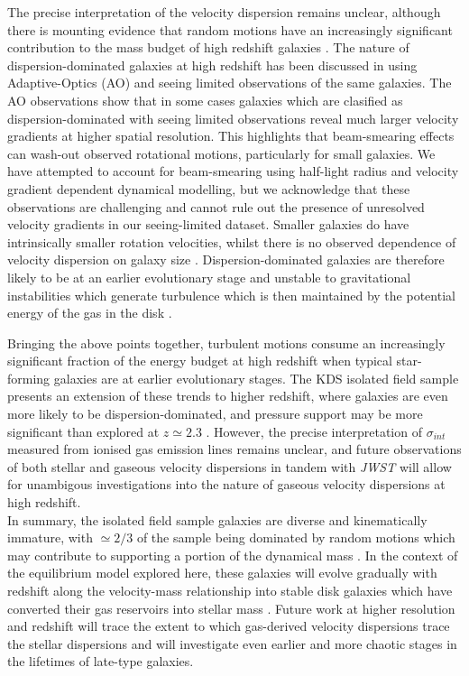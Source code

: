 \documentclass[fleqn,usenatbib]{mnras}
\begin{document}
The precise interpretation of the velocity dispersion remains unclear, although there is mounting evidence that random motions have an increasingly significant contribution to the mass budget of high redshift galaxies \citep[e.g.][]{Kassin2007,Law2009,Burkert2010,Kassin2012,Wuyts2016b,Lang2017,Ubler2017,Genzel2017}.
The nature of dispersion-dominated galaxies at high redshift has been discussed in \cite{Newman2013} using Adaptive-Optics (AO) and seeing limited observations of the same galaxies.
The AO observations show that in some cases galaxies which are clasified as dispersion-dominated with seeing limited observations reveal much larger velocity gradients at higher spatial resolution.
This highlights that beam-smearing effects can wash-out observed rotational motions, particularly for small galaxies.
We have attempted to account for beam-smearing using half-light radius and velocity gradient dependent dynamical modelling, but we acknowledge that these observations are challenging and cannot rule out the presence of unresolved velocity gradients in our seeing-limited dataset.
Smaller galaxies do have intrinsically smaller rotation velocities, whilst there is no observed dependence of velocity dispersion on galaxy size \citep[e.g.][]{Newman2013}.
Dispersion-dominated galaxies are therefore likely to be at an earlier evolutionary stage and unstable to gravitational instabilities which generate turbulence which is then maintained by the potential energy of the gas in the disk \citep{Burkert2010,Newman2013}.

Bringing the above points together, turbulent motions consume an increasingly significant fraction of the energy budget at high redshift when typical star-forming galaxies are at earlier evolutionary stages.
The KDS isolated field sample presents an extension of these trends to higher redshift, where galaxies are even more likely to be dispersion-dominated, and pressure support may be more significant than explored at $z\simeq2.3$ \citep{Wuyts2016b,Ubler2017,Genzel2017,Lang2017}.    
However, the precise interpretation of $\sigma_{int}$ measured from ionised gas emission lines remains unclear, and future observations of both stellar and gaseous velocity dispersions in tandem with {\it JWST} will allow for unambigous investigations into the nature of gaseous velocity dispersions at high redshift. \\

\noindent
In summary, the isolated field sample galaxies are diverse and kinematically immature, with $\simeq2/3$ of the sample being dominated by random motions which may contribute to supporting a portion of the dynamical mass \citep[e.g.][]{Kassin2007,Burkert2010,Kassin2012,Newman2013,Straatman2017,Ubler2017,Lang2017}.
In the context of the equilibrium model explored here, these galaxies will evolve gradually with redshift along the velocity-mass relationship into stable disk galaxies which have converted their gas reservoirs into stellar mass \citep[e.g.][]{Lilly2013,Tacconi2013,Wisnioski2015,Tacconi2017}. 
Future work at higher resolution and redshift will trace the extent to which gas-derived velocity dispersions trace the stellar dispersions and will investigate even earlier and more chaotic stages in the lifetimes of late-type galaxies.
\end{document}
